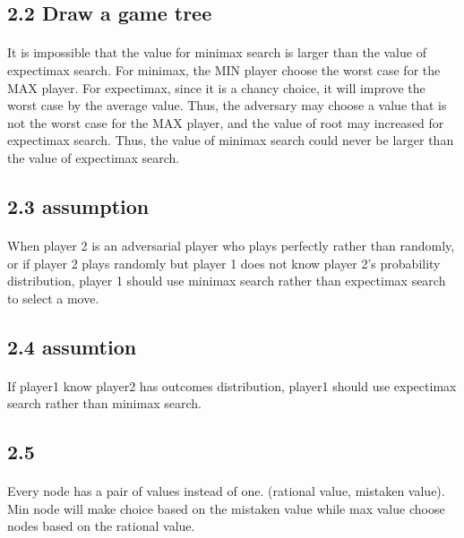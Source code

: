 \documentclass[12pt]{article}
\begin{document}
	\subsection{2.2 Draw a game tree}
		\paragraph{}
			It is impossible that the value for minimax search is larger than the value of expectimax search. For minimax, the MIN player choose the worst case for the MAX player. For expectimax, since it is a chancy choice, it will improve the worst case by the average value. Thus, the adversary may choose a value that is not the worst case for the MAX player, and the value of root may increased for expectimax search. Thus, the value of minimax search could never be larger than the value of expectimax search.

	
	\subsection{2.3 assumption}
		\paragraph{}
			When player 2 is an adversarial player who plays perfectly rather than randomly, 
or if player 2 plays randomly but player 1 does not know player 2’s probability distribution, player 1 should use minimax search rather than expectimax search to select a move. 
			
	\subsection{2.4 assumtion}
		\paragraph{}
			If player1 know player2  has outcomes distribution, player1 should use expectimax search rather than minimax search. 
	
	\subsection{2.5}
		\paragraph{}
Every node has a pair of values instead of one. (rational value, mistaken value).  
Min node will make choice based on the mistaken value while max value choose nodes based on the rational value.
\end{document}
